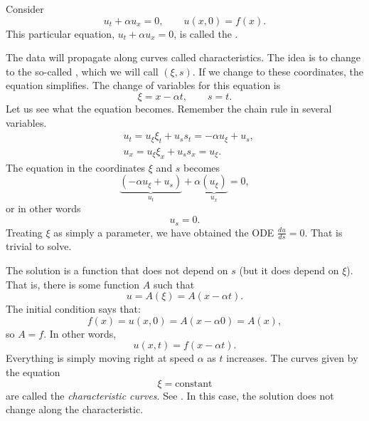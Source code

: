 \begin{example}
Consider
\begin{equation*}
u_t + \alpha u_x = 0, \qquad u(x,0) = f(x) .
\end{equation*}
This particular equation, $u_t + \alpha u_x = 0$, is
called the \emph{}.

The data will propagate along curves called characteristics.  The
idea is to change to the
so-called \emph{}, which we will call
$(\xi,s)$.
If we change to these coordinates, the equation simplifies.  The change of variables for this
equation is
\begin{equation*}
\xi = x - \alpha t ,  \qquad s = t .
\end{equation*}
Let us see what the equation becomes. Remember the chain rule in several
variables.
\begin{align*}
& u_t = u_\xi \xi_t + u_s s_t = - \alpha u_\xi + u_s , \\
& u_x = u_\xi \xi_x + u_s s_x = u_\xi .
\end{align*}
The equation in the coordinates $\xi$ and $s$ becomes
\begin{equation*}
\underbrace{(- \alpha u_\xi + u_s)}_{u_t} + \alpha
\underbrace{(u_\xi)}_{u_x} = 0 ,
\end{equation*}
or in other words
\begin{equation*}
u_s = 0 .
\end{equation*}
Treating $\xi$ as simply a parameter, we have
obtained the ODE $\frac{d u}{d s} = 0$.
That is trivial to solve.

The solution is a function that does
not depend on $s$ (but it does depend on $\xi$).
That is, there is some function $A$ such that
\begin{equation*}
u = A(\xi) = A(x - \alpha t) .
\end{equation*}
The initial condition says that:
\begin{equation*}
f(x) = u(x,0) = A(x - \alpha 0) = A(x) ,
\end{equation*}
so $A=f$.  In other words,
\begin{equation*}
u(x,t) = f(x-\alpha t) .
\end{equation*}
Everything is simply moving right at speed $\alpha$ as $t$ increases.
The curves given by the equation
\begin{equation*}
\xi = \text{constant}
\end{equation*}
are called the \emph{characteristic curves}.
See .
In this case, the solution does not change
along the characteristic.


\end{example}
